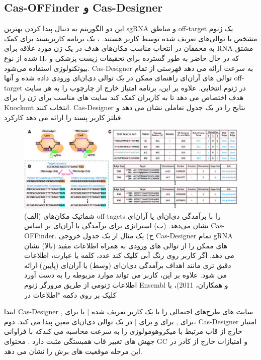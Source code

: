 \documentclass[12pt,a4paper,BCOR=.7cm,headsepline,bibliography=totoc]{report}
\begin{document}
\subsection{Cas-OFFinder و Cas-Designer ~\cite{Cas-OFFinder, Cas-Designer}}
این دو الگوریتم به دنبال پیدا کردن بهترین sgRNA و مناطق off-target یک ژنوم مشخص یا توالی‌های تعریف شده توسط کاربر هستند.
،
 یک برنامه کاربرپسند برای کمک به محققان در انتخاب مناسب مکان‌های هدف در یک ژن مورد علاقه برای RNA مشتق شده از نوع II، که در حال حاضر به طور گسترده برای تحقیقات زیست پزشکی و بیوتکنولوژی استفاده می‌شود. Cas-Designer به سرعت ارائه می دهد
فهرستی از تمام توالی های آر‌ان‌ای راهنمای ممکن در یک توالی دی‌ان‌ای ورودی داده شده و آنها off-target در ژنوم انتخابی. علاوه بر این، برنامه امتیاز خارج از چارچوب را به هر سایت هدف اختصاص می دهد تا به کاربران کمک کند سایت های مناسب برای ژن را برای Knockout انتخاب کنند.
 Cas-Designer نتایج را در یک جدول تعاملی نشان می دهد و فیلتر کاربر پسند را ارائه می دهد
کارکرد.

\begin{figure}[!h]
\centering
\includegraphics[width=16cm, ]{pictures/Cas-Designer.jpg}
\caption{
(الف) شماتیک مکان‌های off-tagets را با برآمدگی دی‌ان‌ای یا آر‌ان‌ای نشان می‌دهد. (ب) استراتژی برای  برآمدگی  یا آر‌ان‌ای بر اساس Cas-OFFinder. ج) یک مثال
از یک جدول خروجی Cas-Designer تمام gRNA های ممکن را از توالی های ورودی به همراه اطلاعات مفید (بالا) نشان می دهد. اگر کاربر روی رنگ آبی کلیک کند
عدد، کلمه یا عبارت، اطلاعات دقیق تری مانند اهداف برآمدگی دی‌ان‌ای (وسط) یا آر‌ان‌ای (پایین) ارائه می شود. علاوه بر این، کاربر می تواند موارد مربوطه را به دست آورد
اطلاعات ژنومی از طریق مرورگر ژنوم Ensembl  و همکاران، 2011)، با کلیک بر روی دکمه "اطلاعات در 
}\label{fig:4}
\end{figure}

ابتدا Cas-Designer سایت های طرح‌های احتمالی را با یک کاربر تعریف شده [ یا  برای ,  برای ,  برای  و  برای ] در یک توالی دی‌ان‌ای معین  پیدا می کند. دوم، Cas-Designer
امتیاز خارج از قاب مرتبط با میکروهومولوژی را به سرعت محاسبه می کندکه با فراوانی جهش های تغییر قاب همبستگی مثبت دارد . محتوای GC و امتیازات خارج از کادر در این مرحله موقعیت های برش را نشان می دهد.
\end{document}
